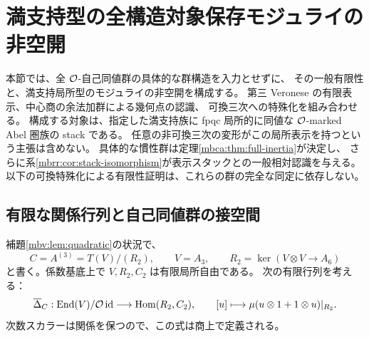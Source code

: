 \section{満支持型の全構造対象保存モジュライの非空開}
\label{mbg:sec:generic-moduli}

本節では、全 $\mathcal O$-自己同値群の具体的な群構造を入力とせずに、
その一般有限性と、満支持局所型のモジュライの非空開を構成する。
第三 Veronese の有限表示、中心商の余法加群による幾何点の認識、
可換三次への特殊化を組み合わせる。
構成する対象は、指定した満支持族に fpqc 局所的に同値な
$\mathcal O$-marked Abel 圏族の stack である。
任意の非可換三次の変形がこの局所表示を持つという主張は含めない。
具体的な慣性群は定理\ref{mbca:thm:full-inertia}が決定し、
さらに系\ref{mbrr:cor:stack-isomorphism}が表示スタックとの一般相対認識を与える。
以下の可換特殊化による有限性証明は、これらの群の完全な同定に依存しない。

\subsection{有限な関係行列と自己同値群の接空間}

補題\ref{mbv:lem:quadratic}の状況で、
\[
 C=A^{(3)}=T(V)/(R_2),\qquad V=A_3,\qquad
 R_2=\ker(V\otimes V\longrightarrow A_6)
\]
と書く。係数基底上で $V,R_2,C_2$ は有限局所自由である。
次の有限行列を考える：
\begin{equation}\label{mbg:eq:derivation-matrix}
 \overline\Delta_C:\operatorname{End}(V)/\mathcal O\operatorname{id}
 \longrightarrow\operatorname{Hom}(R_2,C_2),\qquad
 [u]\longmapsto\mu(u\otimes1+1\otimes u)|_{R_2}.
\end{equation}
次数スカラーは関係を保つので、この式は商上で定義される。


